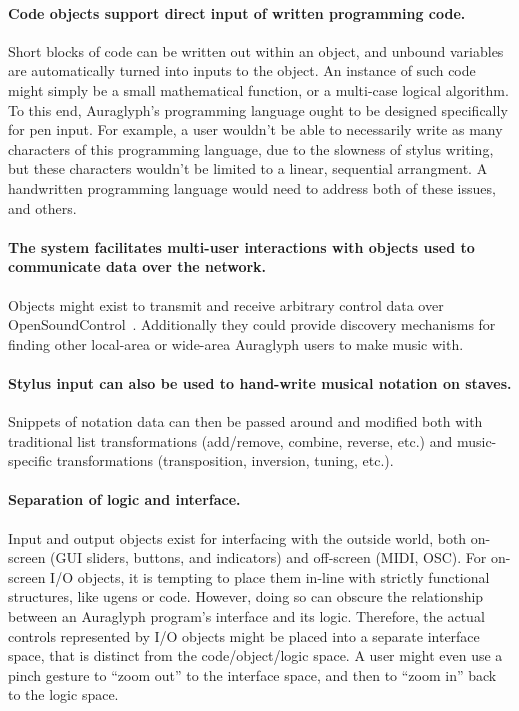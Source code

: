 \documentclass[10pt,letterpaper]{article}
\begin{document}
\paragraph{Code objects support direct input of written programming code.} 
Short blocks of code can be written out within an object, and unbound variables are automatically turned into inputs to the object. 
An instance of such code might simply be a small mathematical function, or a multi-case logical algorithm. 
To this end, Auraglyph's programming language ought to be designed specifically for pen input. 
For example, a user wouldn't be able to necessarily write as many characters of this programming language, due to the slowness of stylus writing, but these characters wouldn't be limited to a linear, sequential arrangment. 
A handwritten programming language would need to address both of these issues, and others. 

\paragraph{The system facilitates multi-user interactions with objects used to communicate data over the network.} 
Objects might exist to transmit and receive arbitrary control data over OpenSoundControl~\cite{wright1997osc}. 
Additionally they could provide discovery mechanisms for finding other local-area or wide-area Auraglyph users to make music with. 

\paragraph{Stylus input can also be used to hand-write musical notation on staves.}
Snippets of notation data can then be passed around and modified both with traditional list transformations (add/remove, combine, reverse, etc.) and music-specific transformations (transposition, inversion, tuning, etc.). 

\paragraph{Separation of logic and interface.}
Input and output objects exist for interfacing with the outside world, both on-screen (GUI sliders, buttons, and indicators) and off-screen (MIDI, OSC). 
For on-screen I/O objects, it is tempting to place them in-line with strictly functional structures, like ugens or code. 
However, doing so can obscure the relationship between an Auraglyph program's interface and its logic. 
Therefore, the actual controls represented by I/O objects might be placed into a separate interface space, that is distinct from the code/object/logic space. 
A user might even use a pinch gesture to ``zoom out'' to the interface space, and then to ``zoom in'' back to the logic space. 
\end{document}
